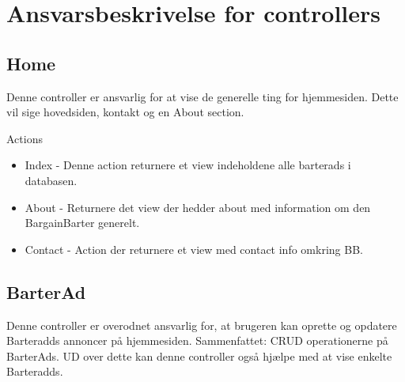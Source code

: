 \section{Ansvarsbeskrivelse for controllers}

\subsection{Home}
Denne controller er ansvarlig for at vise de generelle ting for hjemmesiden. Dette vil sige hovedsiden, kontakt og en About section.  

Actions
\begin{itemize}
	\item Index
	- Denne action returnere et view indeholdene alle barterads i databasen. 
	\item About
	- Returnere det view der hedder about med information om den BargainBarter generelt.
	\item Contact
	- Action der returnere et view med contact info omkring BB.
\end{itemize}


\subsection{BarterAd}
Denne controller er overodnet ansvarlig for, at brugeren kan oprette og opdatere Barteradds annoncer på hjemmesiden. Sammenfattet: CRUD operationerne på BarterAds. UD over dette kan denne controller også hjælpe med at vise enkelte Barteradds.

